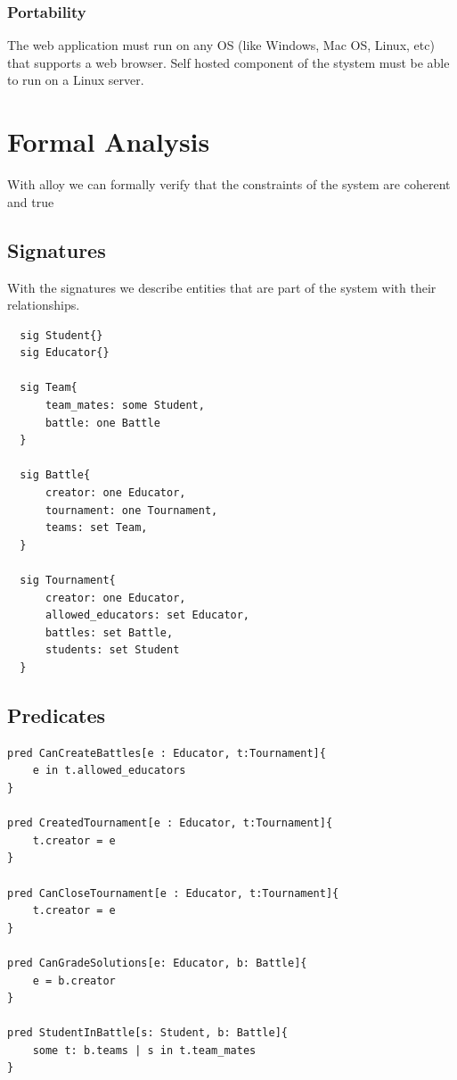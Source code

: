 \documentclass{article}
\begin{document}
\subsubsection{Portability}			
The web application must run on any OS (like Windows, Mac OS, Linux, etc) that supports a web browser.
Self hosted component of the stystem must be able to run on a Linux server.

\newpage
\section{Formal Analysis}
With alloy we can formally verify that the constraints of the system are coherent and true

\subsection{Signatures}
With the signatures we describe entities that are part of the system with their relationships.
\begin{lstlisting}
  sig Student{}
  sig Educator{}
  
  sig Team{
      team_mates: some Student,
      battle: one Battle
  }
  
  sig Battle{
      creator: one Educator,
      tournament: one Tournament,
      teams: set Team,
  }
  
  sig Tournament{
      creator: one Educator,
      allowed_educators: set Educator,
      battles: set Battle,
      students: set Student
  }
\end{lstlisting}

\subsection{Predicates}
\begin{lstlisting}
pred CanCreateBattles[e : Educator, t:Tournament]{
    e in t.allowed_educators
}

pred CreatedTournament[e : Educator, t:Tournament]{
    t.creator = e
}

pred CanCloseTournament[e : Educator, t:Tournament]{
    t.creator = e
}

pred CanGradeSolutions[e: Educator, b: Battle]{
    e = b.creator
}

pred StudentInBattle[s: Student, b: Battle]{
    some t: b.teams | s in t.team_mates
}
\end{lstlisting}
\end{document}
